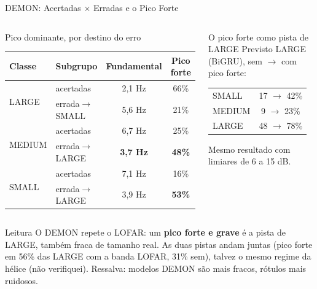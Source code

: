 \documentclass[aspectratio=169]{beamer}
\begin{document}
\begin{frame}{DEMON: Acertadas $\times$ Erradas e o Pico Forte}
    \footnotesize
    \begin{columns}[t]
        \begin{block}{\small Pico dominante, por destino do erro}
            \scriptsize
            \centering
            \setlength{\tabcolsep}{3pt}
            \begin{tabular}{llcc}
            \toprule
            Classe & Subgrupo & Fundamental & Pico forte \\
            \midrule
            \multirow{2}{*}{LARGE} & acertadas & 2,1 Hz & 66\% \\
             & errada$\to$SMALL & 5,6 Hz & 21\% \\
            \midrule
            \multirow{2}{*}{MEDIUM} & acertadas & 6,7 Hz & 25\% \\
             & errada$\to$LARGE & \textbf{3,7 Hz} & \textbf{48\%} \\
            \midrule
            \multirow{2}{*}{SMALL} & acertadas & 7,1 Hz & 16\% \\
             & errada$\to$LARGE & 3,9 Hz & \textbf{53\%} \\
            \bottomrule
            \end{tabular}
        \end{block}
        \begin{block}{\small O pico forte como pista de LARGE}
            \scriptsize
            Previsto LARGE (BiGRU), sem $\to$ com pico forte:

            \vspace{0.05cm}
            \centering
            \begin{tabular}{lc}
            \toprule
            SMALL & 17 $\to$ 42\% \\
            MEDIUM & 9 $\to$ 23\% \\
            LARGE & 48 $\to$ 78\% \\
            \bottomrule
            \end{tabular}

            \vspace{0.05cm}
            \raggedright
            Mesmo resultado com limiares de 6 a 15 dB.
        \end{block}
    \end{columns}
    \vspace{0.1cm}
    \begin{alertblock}{Leitura}
        \scriptsize
        O DEMON repete o LOFAR: um \textbf{pico forte e grave} é a pista de LARGE, também fraca de tamanho real. As duas pistas andam juntas (pico forte em 56\% das LARGE com a banda LOFAR, 31\% sem), talvez o mesmo regime da hélice (não verifiquei). Ressalva: modelos DEMON são mais fracos, rótulos mais ruidosos.
    \end{alertblock}
\end{frame}
\end{document}
